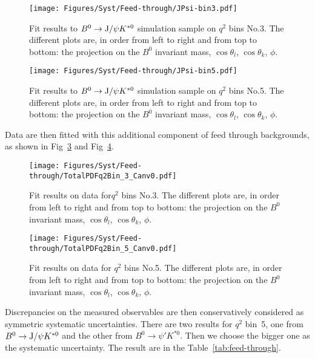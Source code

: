 \begin{figure}[!hbt]
  \centering
  \texttt{[image: Figures/Syst/Feed-through/JPsi-bin3.pdf]}
  \caption{Fit results to $B^0 \to {\rm J/}\psi K^{*0}$ simulation sample on $q^2$ bins No.3.
    The different plots are, in order from left to right and from top to bottom: the 
    projection on the $B^0$ invariant mass, $\cos\theta_l$, $\cos\theta_k$, $\phi$. }
  \label{fig:feed-J-bin3}
\end{figure}

\begin{figure}[!hbt]
  \centering
  \texttt{[image: Figures/Syst/Feed-through/JPsi-bin5.pdf]}
  \caption{Fit results to $B^0 \to {\rm J/}\psi K^{*0}$ simulation sample on $q^2$ bins No.5. 
    The different plots are, in order from left to right and from top to bottom: the 
    projection on the $B^0$ invariant mass, $\cos\theta_l$, $\cos\theta_k$, $\phi$. }
  \label{fig:feed-J-bin5}
\end{figure} 

Data are then fitted with this additional component of feed through backgrounds, as shown in Fig~\ref{fig:feed-t-bin3} and Fig~\ref{fig:feed-t-bin5}.

\begin{figure}[!hbt]
  \centering
  \texttt{[image: Figures/Syst/Feed-through/TotalPDFq2Bin\_3\_Canv0.pdf]}
  \caption{Fit results on data for$q^2$ bins No.3. The different plots are, in order from left 
    to right and from top to bottom: the projection on the $B^0$ invariant mass, $\cos\theta_l$, $\cos\theta_k$, $\phi$. }
  \label{fig:feed-t-bin3}
\end{figure}

\begin{figure}[!hbt]
  \centering
  \texttt{[image: Figures/Syst/Feed-through/TotalPDFq2Bin\_5\_Canv0.pdf]}
  \caption{Fit results on data for $q^2$ bins No.5. The different plots are, in order from left
    to right and from top to bottom: the projection on the $B^0$ invariant mass, $\cos\theta_l$, $\cos\theta_k$, $\phi$. }
  \label{fig:feed-t-bin5}
\end{figure} 

Discrepancies on the measured observables are then conservatively considered as symmetric systematic uncertainties.
There are two results for $q^2$ bin~5, one from $B^0 \to {\rm J/}\psi K^{*0}$ and the other from $B^0 \to \psi' K^{*0}$.
Then we choose the bigger one as the systematic uncertainty.
The result are in the Table~\ref{tab:feed-through}.

